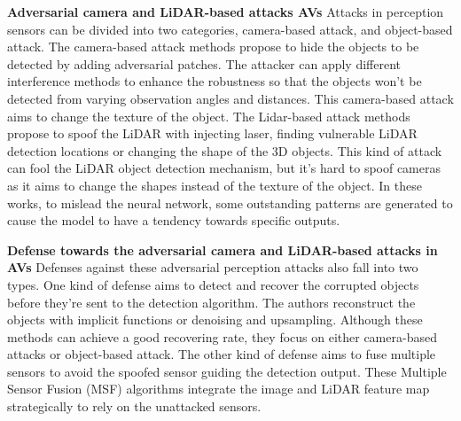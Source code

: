 
\textbf{Adversarial camera and LiDAR-based attacks AVs}
Attacks in perception sensors can be divided into two categories, camera-based attack, and object-based attack. The
camera-based attack methods\cite{7, 9, 23} propose to hide the
objects to be detected by adding adversarial patches. The attacker
can apply different interference methods to enhance the
robustness so that the objects won’t be detected from varying
observation angles and distances. This camera-based attack
aims to change the texture of the object\cite{msf-adv}. The Lidar-based
attack methods\cite{4, 6, 19, 25} propose to spoof the LiDAR with
injecting laser\cite{6}, finding vulnerable LiDAR detection locations\cite{25} or changing the shape of the 3D objects\cite{4}. This
kind of attack can fool the LiDAR object detection mechanism,
but it’s hard to spoof cameras as it aims to change the shapes
instead of the texture of the object\cite{msf-adv}. 
In these works, to mislead the neural network, some outstanding patterns are generated
to cause the model to have a tendency towards specific outputs.

\textbf{Defense towards the adversarial camera and LiDAR-based
attacks in AVs}
Defenses against these adversarial perception attacks also
fall into two types. One kind of defense\cite{if-defense, 22, 24} aims to
detect and recover the corrupted objects before they’re sent
to the detection algorithm. The authors reconstruct the objects
with implicit functions\cite{if-defense} or denoising and upsampling\cite{24}.
Although these methods can achieve a good recovering rate,
they focus on either camera-based attacks or object-based
attack. The other kind of defense aims to fuse multiple sensors\cite{10, 15, 16, 21} to avoid the spoofed sensor guiding the
detection output. These Multiple Sensor Fusion (MSF) algorithms integrate the image and LiDAR feature map 
strategically to rely on the unattacked sensors.

